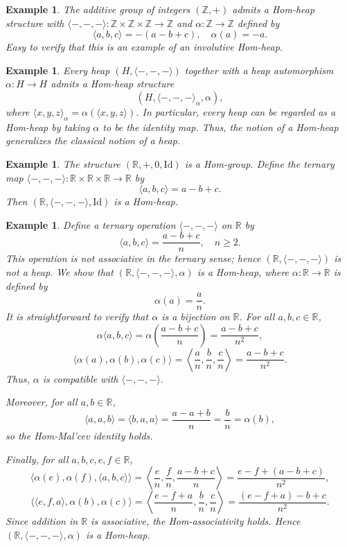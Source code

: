 \documentclass[14pt]{article}
\theoremstyle{Definition}
\newtheorem{Exam}[thm]{Example}
\theoremstyle{remark}
\begin{document}
\begin{Exam}
The additive group of integers $(\mathbb{Z}, +)$ admits a Hom-heap structure with  
$\langle -,-,- \rangle : \mathbb{Z} \times \mathbb{Z} \times \mathbb{Z} \to \mathbb{Z}$ and $\alpha : \mathbb{Z} \to \mathbb{Z}$ defined by  
\[
\langle a, b, c \rangle = -(a - b + c), \quad \alpha(a) = -a.
\]
Easy to verify that this is an example of an involutive Hom-heap.
\end{Exam}
\begin{Exam}
Every heap $(H,\langle -,-,- \rangle)$ together with a heap automorphism $\alpha:H\to H$ admits a Hom-heap structure 
\[
(H,\langle -,-,- \rangle_{\alpha},\alpha),
\]
where $\langle x,y,z\rangle_{\alpha} = \alpha(\langle x,y,z\rangle)$.  
In particular, every heap can be regarded as a Hom-heap by taking $\alpha$ to be the identity map.  
Thus, the notion of a Hom-heap generalizes the classical notion of a heap.
\end{Exam}

\begin{Exam}
The structure $(\mathbb{R},+,0,\mathrm{Id})$ is a Hom-group.  
Define the ternary map $\langle -,-,- \rangle : \mathbb{R} \times \mathbb{R} \times \mathbb{R} \to \mathbb{R}$ by  
\[
\langle a,b,c \rangle = a - b + c.
\]  
Then $(\mathbb{R},\langle -,-,- \rangle,\mathrm{Id})$ is a Hom-heap.  
\end{Exam}

\begin{Exam}
Define a ternary operation $\langle -,-,- \rangle$ on $\mathbb{R}$ by  
\[
\langle a,b,c \rangle = \frac{a - b + c}{n}, \quad n \geq 2.
\]  
This operation is not associative in the ternary sense; hence $(\mathbb{R},\langle -,-,- \rangle)$ is not a heap.  
We show that $(\mathbb{R},\langle -,-,- \rangle,\alpha)$ is a Hom-heap, where $\alpha: \mathbb{R} \to \mathbb{R}$ is defined by  
\[
\alpha(a) = \frac{a}{n}.
\]  
It is straightforward to verify that $\alpha$ is a bijection on $\mathbb{R}$. For all $a,b,c \in \mathbb{R}$,  
\[
\alpha\langle a,b,c \rangle = \alpha\left( \frac{a - b + c}{n} \right) = \frac{a - b + c}{n^2},
\]  
\[
\langle \alpha(a),\alpha(b),\alpha(c) \rangle = \left\langle \frac{a}{n},\frac{b}{n},\frac{c}{n} \right\rangle = \frac{a - b + c}{n^2}.
\]  
Thus, $\alpha$ is compatible with $\langle -,-,- \rangle$.  

Moreover, for all $a,b \in \mathbb{R}$,  
\[
\langle a,a,b \rangle = \langle b,a,a \rangle = \frac{a-a+b}{n} = \frac{b}{n} = \alpha(b),
\]  
so the Hom-Mal'cev identity holds.  

Finally, for all $a,b,c,e,f \in \mathbb{R}$,  
\[
\langle \alpha(e),\alpha(f),\langle a,b,c \rangle \rangle 
= \left\langle \frac{e}{n},\frac{f}{n},\frac{a-b+c}{n} \right\rangle 
= \frac{e - f + (a - b + c)}{n^2},
\]  
\[
\langle \langle e,f,a \rangle,\alpha(b),\alpha(c) \rangle 
= \left\langle \frac{e - f + a}{n},\frac{b}{n},\frac{c}{n} \right\rangle 
= \frac{(e - f + a) - b + c}{n^2}.
\]  
Since addition in $\mathbb{R}$ is associative, the Hom-associativity holds.  
Hence $(\mathbb{R},\langle -,-,- \rangle,\alpha)$ is a Hom-heap.
\end{Exam}
\end{document}
